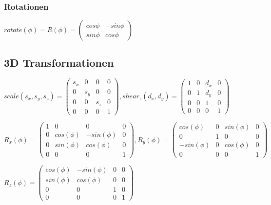 \documentclass[paper=a4, fontsize=11pt]{scrartcl} %
\numberwithin{equation}{section} %
\numberwithin{figure}{section} %
\numberwithin{table}{section} %
\begin{document}
\subsubsection{Rotationen}

$rotate(\phi) = R(\phi) = 
\left(
   \begin{array}{cc}
     cos \phi & -sin \phi\\
     sin \phi & cos \phi
   \end{array}
\right)$

\subsection{3D Transformationen}

$scale(s_x,s_y,s_z) = 
\left(
   \begin{array}{cccc}
     s_x & 0 & 0 & 0\\
     0 & s_y & 0 & 0\\
     0 & 0 & s_z & 0\\
     0 & 0 & 0 &1
   \end{array}
\right),shear_z(d_x,d_y) = 
\left(
   \begin{array}{cccc}
     1 & 0 & d_x & 0\\
     0 & 1 & d_y & 0\\
     0 & 0 & 1 & 0\\
     0 & 0 & 0 &1
   \end{array}
\right)$

$R_x(\phi) = 
\left(
   \begin{array}{cccc}
     1 & 0 & 0 & 0\\
     0 & cos(\phi) & -sin(\phi) & 0\\
     0 & sin(\phi) & cos(\phi) & 0\\
     0 & 0 & 0 &1
   \end{array}
\right),R_y(\phi) = 
\left(
   \begin{array}{cccc}
     cos(\phi) & 0 & sin(\phi) & 0\\
     0 & 1 & 0 & 0\\
     -sin(\phi) & 0 & cos(\phi) & 0\\
     0 & 0 & 0 & 1
   \end{array}
\right)$

$R_z(\phi) = 
\left(
   \begin{array}{cccc}
     cos(\phi) & -sin(\phi) & 0 & 0\\
     sin(\phi) & cos(\phi) & 0 & 0\\
     0 & 0 & 1 & 0\\
     0 & 0 & 0 & 1
   \end{array}
\right)$
\end{document}
